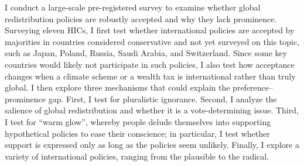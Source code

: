\documentclass[12pt,english]{article}
\begin{document}
I conduct a large-scale pre-registered survey to examine whether global redistribution policies are robustly accepted and why they lack prominence. Surveying eleven HICs, I first test whether international policies are accepted by majorities in countries considered conservative and not yet surveyed on this topic, such as Japan, Poland, Russia, Saudi Arabia, and Switzerland. Since some key countries would likely not participate in such policies, I also test how acceptance changes when a climate scheme or a wealth tax is international rather than truly global. I then explore three %
mechanisms that could explain the preference--prominence gap. 
First, I test for pluralistic ignorance. Second, I analyze the salience of global redistribution and whether it is a vote-determining issue. Third, I test for ``warm glow'', whereby people delude themselves into supporting hypothetical policies to ease their conscience; in particular, I test whether support is expressed only as long as the policies seem unlikely. Finally, I explore a variety of international policies, ranging from the plausible to the radical. %
\end{document}
